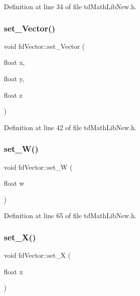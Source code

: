 Definition at line 34 of file td\+Math\+Lib\+New.\+h.

\hypertarget{classfd_vector_abfb903efd118f8e79eefa6a3563e108f}{}\label{classfd_vector_abfb903efd118f8e79eefa6a3563e108f} 
\subsubsection{\texorpdfstring{set\+\_\+\+Vector()}{set\_Vector()}\hspace{0.1cm}{\footnotesize\ttfamily [2/2]}}
{\footnotesize\ttfamily void fd\+Vector\+::set\+\_\+\+Vector (\begin{DoxyParamCaption}\item[{float}]{x,  }\item[{float}]{y,  }\item[{float}]{z }\end{DoxyParamCaption})\hspace{0.3cm}{\ttfamily [inline]}}



Definition at line 42 of file td\+Math\+Lib\+New.\+h.

\hypertarget{classfd_vector_a700e29b9a1e0a872bbb1c41480522962}{}\label{classfd_vector_a700e29b9a1e0a872bbb1c41480522962} 
\subsubsection{\texorpdfstring{set\+\_\+\+W()}{set\_W()}}
{\footnotesize\ttfamily void fd\+Vector\+::set\+\_\+W (\begin{DoxyParamCaption}\item[{float}]{w }\end{DoxyParamCaption})\hspace{0.3cm}{\ttfamily [inline]}}



Definition at line 65 of file td\+Math\+Lib\+New.\+h.

\hypertarget{classfd_vector_a96a3763b89af618c024743dc9e681b12}{}\label{classfd_vector_a96a3763b89af618c024743dc9e681b12} 
\subsubsection{\texorpdfstring{set\+\_\+\+X()}{set\_X()}}
{\footnotesize\ttfamily void fd\+Vector\+::set\+\_\+X (\begin{DoxyParamCaption}\item[{float}]{x }\end{DoxyParamCaption})\hspace{0.3cm}{\ttfamily [inline]}}



